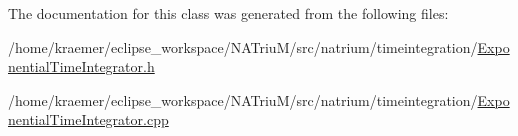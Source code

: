 The documentation for this class was generated from the following files\-:\begin{DoxyCompactItemize}
\item 
/home/kraemer/eclipse\-\_\-workspace/\-N\-A\-Triu\-M/src/natrium/timeintegration/\hyperlink{ExponentialTimeIntegrator_8h}{Exponential\-Time\-Integrator.\-h}\item 
/home/kraemer/eclipse\-\_\-workspace/\-N\-A\-Triu\-M/src/natrium/timeintegration/\hyperlink{ExponentialTimeIntegrator_8cpp}{Exponential\-Time\-Integrator.\-cpp}\end{DoxyCompactItemize}
